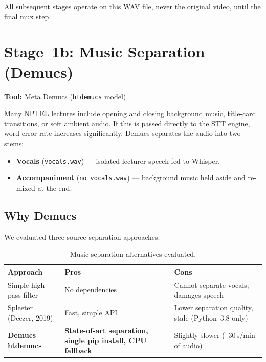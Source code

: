 \documentclass[12pt,a4paper]{article}
\begin{document}
All subsequent stages operate on this WAV file, never the original video,
until the final mux step.

\section{Stage~1b: Music Separation (Demucs)}

\textbf{Tool:} Meta Demucs (\texttt{htdemucs} model)

Many NPTEL lectures include opening and closing background music, title-card
transitions, or soft ambient audio.  If this is passed directly to the STT
engine, word error rate increases significantly.  Demucs separates the audio
into two stems:

\begin{itemize}
  \item \textbf{Vocals} (\texttt{vocals.wav}) — isolated lecturer speech fed
        to Whisper.
  \item \textbf{Accompaniment} (\texttt{no\_vocals.wav}) — background music
        held aside and re-mixed at the end.
\end{itemize}

\subsection{Why Demucs}

We evaluated three source-separation approaches:

\begin{table}[H]
\centering
\begin{tabularx}{\linewidth}{lXX}
\toprule
\textbf{Approach} & \textbf{Pros} & \textbf{Cons} \\
\midrule
Simple high-pass filter   & No dependencies    & Cannot separate vocals; damages speech \\
Spleeter (Deezer, 2019)   & Fast, simple API   & Lower separation quality, stale (Python~3.8 only) \\
\textbf{Demucs htdemucs}  & \textbf{State-of-art separation, single pip install, CPU fallback} & Slightly slower (~30\,s/min of audio) \\
\bottomrule
\end{tabularx}
\caption{Music separation alternatives evaluated.}
\end{table}
\end{document}
